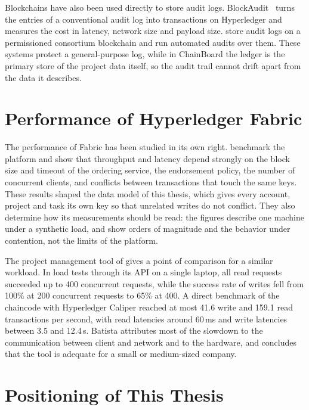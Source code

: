 Blockchains have also been used directly to store audit logs. BlockAudit~\cite{ahmad2018blockaudit} turns the entries of a conventional audit log into transactions on Hyperledger and measures the cost in latency, network size and payload size. \textcite{belchior2020audits} store audit logs on a permissioned consortium blockchain and run automated audits over them. These systems protect a general-purpose log, while in ChainBoard the ledger is the primary store of the project data itself, so the audit trail cannot drift apart from the data it describes.

\section{Performance of Hyperledger Fabric}
\label{sec:related-performance}

The performance of Fabric has been studied in its own right. \textcite{thakkar2018performance} benchmark the platform and show that throughput and latency depend strongly on the block size and timeout of the ordering service, the endorsement policy, the number of concurrent clients, and conflicts between transactions that touch the same keys. These results shaped the data model of this thesis, which gives every account, project and task its own key so that unrelated writes do not conflict. They also determine how its measurements should be read: the figures describe one machine under a synthetic load, and show orders of magnitude and the behavior under contention, not the limits of the platform.

The project management tool of \textcite{batista2021} gives a point of comparison for a similar workload. In load tests through its API on a single laptop, all read requests succeeded up to 400 concurrent requests, while the success rate of writes fell from 100\% at 200 concurrent requests to 65\% at 400. A direct benchmark of the chaincode with Hyperledger Caliper reached at most 41.6 write and 159.1 read transactions per second, with read latencies around 60\,ms and write latencies between 3.5 and 12.4\,s. Batista attributes most of the slowdown to the communication between client and network and to the hardware, and concludes that the tool is adequate for a small or medium-sized company.

\section{Positioning of This Thesis}
\label{sec:positioning}


